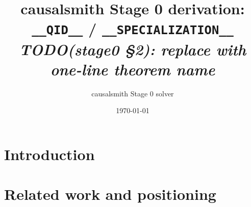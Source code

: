 \documentclass[11pt]{article}
\title{causalsmith Stage 0 derivation: \texttt{__QID__} / \texttt{__SPECIALIZATION__}%
  \\ \large\textit{TODO(stage0 \S2): replace with one-line theorem name}}
\author{causalsmith Stage 0 solver}
\date{\today}
\theoremstyle{definition}
\theoremstyle{plain}
\theoremstyle{remark}
\begin{document}
\maketitle


\begin{abstract}
\end{abstract}

\section{Introduction}

\section{Related work and positioning}
\end{document}
